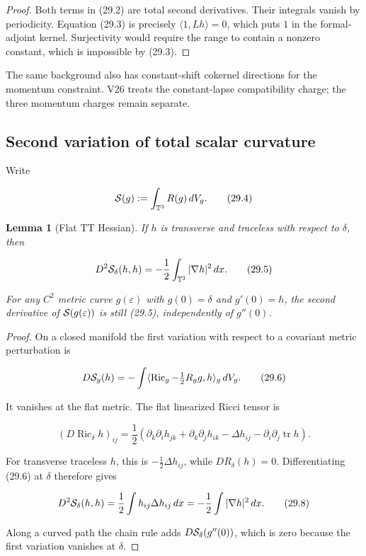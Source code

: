 \documentclass[11pt]{article}
\newtheorem{lemma}[theorem]{Lemma}
\theoremstyle{remark}
\begin{document}
\begin{proof}
Both terms in (29.2) are total second derivatives.  Their integrals vanish
by periodicity.  Equation (29.3) is precisely
\(\langle1,Lh\rangle=0\), which puts \(1\) in the formal-adjoint kernel.
Surjectivity would require the range to contain a nonzero constant, which
is impossible by (29.3).
\end{proof}

The same background also has constant-shift cokernel directions for the
momentum constraint.  V26 treats the constant-lapse compatibility charge;
the three momentum charges remain separate.

\subsection{Second variation of total scalar curvature}

Write

\[
 {\cal S}(g):=\int_{\mathbb T^3}R(g)\,dV_g.                    \tag{29.4}
\]

\begin{lemma}[Flat TT Hessian]
\label{lem:v19v26-hessian}
If \(h\) is transverse and traceless with respect to \(\delta\), then

\[
 D^2{\cal S}_\delta(h,h)
 =-\frac12\int_{\mathbb T^3}|\nabla h|^2\,dx.                 \tag{29.5}
\]

For any \(C^2\) metric curve \(g(\varepsilon)\) with
\(g(0)=\delta\) and \(g'(0)=h\), the second derivative of
\({\cal S}(g(\varepsilon))\) is still (29.5), independently of
\(g''(0)\).
\end{lemma}

\begin{proof}
On a closed manifold the first variation with respect to a covariant
metric perturbation is

\[
 D{\cal S}_g(h)=-\int\langle
 \operatorname{Ric}_g-\tfrac12R_gg,h\rangle_g\,dV_g.           \tag{29.6}
\]

It vanishes at the flat metric.  The flat linearized Ricci tensor is

\[
 (D\operatorname{Ric}_\delta h)_{ij}
 =\frac12\left(
 \partial_k\partial_i h_{jk}
 +\partial_k\partial_j h_{ik}
 -\Delta h_{ij}
 -\partial_i\partial_j\operatorname{tr}h\right).              \tag{29.7}
\]

For transverse traceless \(h\), this is
\(-\tfrac12\Delta h_{ij}\), while \(DR_\delta(h)=0\).  Differentiating
(29.6) at \(\delta\) therefore gives

\[
 D^2{\cal S}_\delta(h,h)
 =\frac12\int h_{ij}\Delta h_{ij}\,dx
 =-\frac12\int|\nabla h|^2\,dx.                               \tag{29.8}
\]

Along a curved path the chain rule adds
\(D{\cal S}_\delta(g''(0))\), which is zero because the first variation
vanishes at \(\delta\).
\end{proof}
\end{document}
